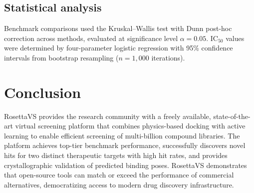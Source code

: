 \documentclass[11pt]{article}
\begin{document}
\subsection{Statistical analysis}

Benchmark comparisons used the Kruskal--Wallis test with Dunn post-hoc correction across methods, evaluated at significance level $\alpha = 0.05$. IC$_{50}$ values were determined by four-parameter logistic regression with 95\% confidence intervals from bootstrap resampling ($n = 1{,}000$ iterations).

\section{Conclusion}

RosettaVS provides the research community with a freely available, state-of-the-art virtual screening platform that combines physics-based docking with active learning to enable efficient screening of multi-billion compound libraries. The platform achieves top-tier benchmark performance, successfully discovers novel hits for two distinct therapeutic targets with high hit rates, and provides crystallographic validation of predicted binding poses. RosettaVS demonstrates that open-source tools can match or exceed the performance of commercial alternatives, democratizing access to modern drug discovery infrastructure.



\end{document}
